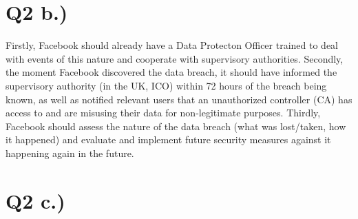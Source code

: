 \documentclass[a4paper]{article}
\begin{document}
\section*{Q2 b.)}

Firstly, Facebook should already have a Data Protecton Officer trained to deal with events of this nature and cooperate with supervisory authorities. Secondly, the moment Facebook discovered the data breach, it should have informed the supervisory authority (in the UK, ICO) within 72 hours of the breach being known, as well as notified relevant users that an unauthorized controller (CA) has access to and are misusing their data for non-legitimate purposes. Thirdly, Facebook should assess the nature of the data breach (what was lost/taken, how it happened) and evaluate and implement future security measures against it happening again in the future.

\section*{Q2 c.)}
\end{document}
